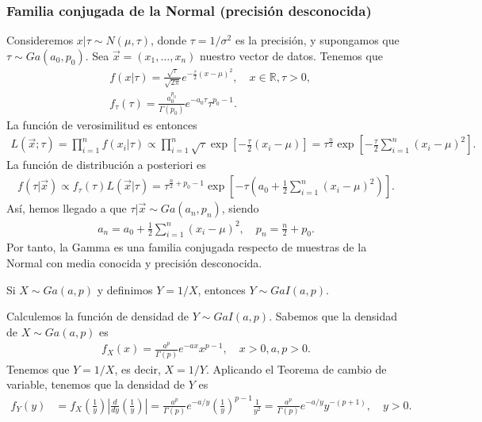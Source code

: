 \subsubsection{Familia conjugada de la Normal (precisión desconocida)}
\noindent Consideremos $x | \tau \sim N(\mu,\tau)$, donde $\tau = 1/\sigma^2$ es la precisión, y supongamos que $\tau \sim Ga(a_0,p_0)$. Sea $\vec{x} = (x_1,\ldots,x_n)$ nuestro vector de datos. Tenemos que
\begin{align*}
    &f(x |\tau) = \frac{\sqrt{\tau}}{\sqrt{2\pi}}e^{-\frac{\tau}{2}(x -\mu)^2}, \quad x \in \mathbb{R}, \tau > 0,\\ 
    &f_{\tau}(\tau) = \frac{a_0^{p_0}}{\Gamma(p_0)}e^{-a_0 \tau}\tau^{p_0-1}.
\end{align*}
La función de verosimilitud es entonces
\begin{align*}
    L(\vec{x};\tau) = \prod_{i=1}^{n} f(x_i | \tau) \propto \prod_{i=1}^{n} \sqrt{\tau} \exp\left[-\frac{\tau}{2}(x_i - \mu)\right] = \tau^{\frac{n}{2}}\exp\left[-\frac{\tau}{2} \sum_{i=1}^{n}(x_i -\mu)^2\right].
\end{align*}
La función de distribución a posteriori es
\begin{align*}
    f(\tau | \vec{x}) \propto f_{\tau}(\tau) L(\vec{x} | \tau) = \tau^{\frac{n}{2} + p_0 -1} \exp\left[ - \tau \left( a_0 + \frac{1}{2} \sum_{i=1}^{n}(x_i-\mu)^2 \right) \right].
\end{align*}
Así, hemos llegado a que $\tau | \vec{x} \sim Ga(a_n,p_n)$, siendo
\begin{align*}
    a_n = a_0 + \frac{1}{2} \sum_{i=1}^{n} (x_i - \mu)^2, \quad p_n = \frac{n}{2} + p_0.
\end{align*}
Por tanto, la Gamma es una familia conjugada respecto de muestras de la Normal con media conocida y precisión desconocida.

\begin{defi}
    Si $X \sim Ga(a,p)$ y definimos $Y = 1/X$, entonces $Y \sim  GaI(a,p)$.
\end{defi}
Calculemos la función de densidad de $Y \sim  GaI(a,p)$. Sabemos que la densidad de $X \sim Ga(a,p)$ es
\begin{align*}
    f_X(x) = \frac{a^p}{\Gamma(p)} e^{-ax}x^{p-1}, \quad x >0, a,p>0.
\end{align*}
Tenemos que $Y = 1/X$, es decir, $X = 1/Y$. Aplicando el Teorema de cambio de variable, tenemos que la densidad de $Y$ es
\begin{align*}
    f_Y(y) &= f_X\left( \frac{1}{y} \right) \left| \frac{d}{dy} \left( \frac{1}{y} \right) \right| = \frac{a^p}{\Gamma(p)} e^{-a/y} \left( \frac{1}{y} \right)^{p-1} \frac{1}{y^2} 
    = \frac{a^p}{\Gamma(p)}  e^{-a/y} y^{-(p+1)}, \quad y > 0.
\end{align*}

